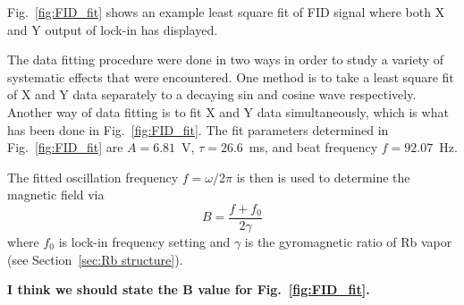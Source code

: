 Fig.~\ref{fig:FID_fit} shows an example least square fit of FID signal
where both X and Y output of lock-in has displayed.

The data fitting procedure were done in two ways in order to study a
variety of systematic effects that were encountered. One method is to
take a least square fit of X and Y data separately to a decaying sin
and cosine wave respectively.  Another way of data fitting is to fit X
and Y data simultaneously, which is what has been done in
Fig.~\ref{fig:FID_fit}.  The fit parameters determined in
Fig.~\ref{fig:FID_fit} are $A=6.81$~V, $\tau=26.6$~ms, and beat
frequency $f=92.07$~Hz.

The fitted oscillation frequency $f=\omega/2\pi$ is then is used to
determine the magnetic field via
\begin{equation}
B=\frac{f+f_0}{2\gamma}\label{eq:field}
\end{equation}
where $f_0$ is lock-in frequency setting and $\gamma$ is the
gyromagnetic ratio of Rb vapor (see Section~\ref{sec:Rb structure}).

{\bf I think we should state the B value for Fig.~\ref{fig:FID_fit}.}

 



